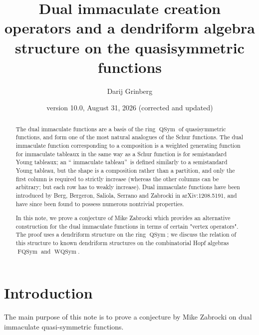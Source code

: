 \documentclass
[numbers=enddot,12pt,final,onecolumn,notitlepage,abstracton]{scrartcl}%
\theoremstyle{definition}
\newenvironment{noncompile}{}{}
\begin{document}
\title{Dual immaculate creation operators and a dendriform algebra structure on the
quasisymmetric functions}
\author{Darij Grinberg}
\date{version 10.0, August 31, 2026 (corrected and updated)}
\maketitle

\begin{abstract}
The dual immaculate functions are a basis of the ring $\operatorname*{QSym}$
of quasisymmetric functions, and form one of the most natural analogues of the
Schur functions. The dual immaculate function corresponding to a composition
is a weighted generating function for immaculate tableaux in the same way as a
Schur function is for semistandard Young tableaux; an \textquotedblleft
immaculate tableau\textquotedblright\ is defined similarly to a semistandard
Young tableau, but the shape is a composition rather than a partition, and
only the first column is required to strictly increase (whereas the other
columns can be arbitrary; but each row has to weakly increase). Dual
immaculate functions have been introduced by Berg, Bergeron, Saliola, Serrano
and Zabrocki in arXiv:1208.5191, and have since been found to possess numerous
nontrivial properties.

In this note, we prove a conjecture of Mike Zabrocki which provides an
alternative construction for the dual immaculate functions in terms of certain
"vertex operators". The proof uses a dendriform structure on the ring
$\operatorname*{QSym}$; we discuss the relation of this structure to known
dendriform structures on the combinatorial Hopf algebras
$\operatorname*{FQSym}$ and $\operatorname*{WQSym}$.

\end{abstract}

\section{Introduction}

\begin{noncompile}
The main purpose of this note is to prove a conjecture by Mike Zabrocki on
dual immaculate quasi-symmetric functions.
\end{noncompile}
\end{document}
